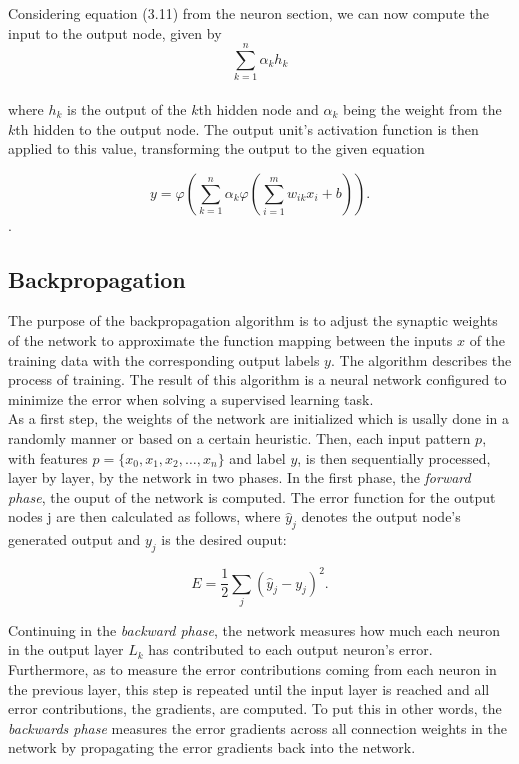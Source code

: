 Considering equation (3.11) from the neuron section, we can now compute the input to the output node, given by\\
\begin{equation}
  \sum_{k=1}^{n} \alpha_k h_k
\end{equation}
\\
where $h_k$ is the output of the $k$th hidden node and $\alpha_k$ being the weight from the $k$th hidden to the output node. The output unit's activation function is then applied to this value, transforming the output to the given equation

\begin{equation}
  y = \varphi\left(\sum_{k=1}^{n} \alpha_k \varphi \left(\sum_{i=1}^{m} w_{ik} x_i + b \right)\right).
\end{equation}.

\subsection{Backpropagation}
\label{sec:backprop}
The purpose of the backpropagation algorithm \cite{rumelhart1988learning} is to adjust the synaptic weights of the network to approximate the function mapping between the inputs $x$ of the training data with the corresponding output labels $y$. The algorithm describes the process of training. The result of this algorithm is a neural network configured to minimize the error when solving a supervised learning task.\\

As a first step, the weights of the network are initialized which is usally done in a randomly manner or based on a certain heuristic. Then, each input pattern $p$, with features $p = \{x_0,x_1, x_2, \dots, x_n \}$ and label $y$, is then sequentially processed, layer by layer, by the network in two phases. In the first phase, the \textit{forward phase}, the ouput of the network is computed. The error function for the output nodes j are then calculated as follows, where $\hat{y}_j$ denotes the output node's generated output and $y_j$ is the desired ouput:

\begin{equation}
  E = \frac{1}{2}\sum_{j} (\hat{y}_j - y_j)^2.
\end{equation}

Continuing in the \textit{backward phase}, the network measures how much each neuron in the output layer $L_k$ has contributed to each output neuron's error. Furthermore, as to measure the error contributions coming from each neuron in the previous layer, this step is repeated until the input layer is reached and all error contributions, the gradients, are computed. To put this in other words, the \textit{backwards phase} measures the error gradients across all connection weights in the network by propagating the error gradients back into the network. \\

